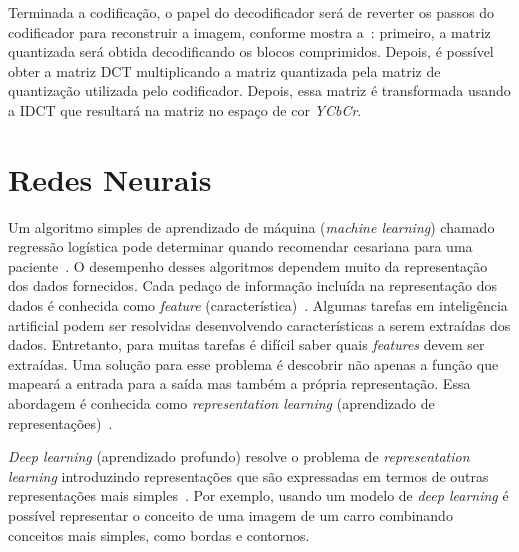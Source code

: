 Terminada a codificação, o papel do decodificador será de reverter os passos do codificador para reconstruir a imagem, conforme mostra a~: primeiro, a matriz quantizada será obtida decodificando os blocos comprimidos. Depois, é possível obter a matriz \acrshort{DCT} multiplicando a matriz quantizada pela matriz de quantização utilizada pelo codificador. Depois, essa matriz é transformada usando a \acrshort{IDCT} que resultará na matriz no espaço de cor \textit{YCbCr}.
\section{Redes Neurais}
Um algoritmo simples de aprendizado de máquina (\textit{machine learning}) chamado regressão logística pode determinar quando recomendar cesariana para uma paciente~\cite{mor1990ranking}. O desempenho desses algoritmos dependem muito da representação dos dados fornecidos. Cada pedaço de informação incluída na representação dos dados é conhecida como \textit{feature} (característica)~\cite{deeplearning}. Algumas tarefas em inteligência artificial podem ser resolvidas desenvolvendo características a serem extraídas dos dados. Entretanto, para muitas tarefas é difícil saber quais \textit{features} devem ser extraídas. Uma solução para esse problema é descobrir não apenas a função que mapeará a entrada para a saída mas também a própria representação. Essa abordagem é conhecida como \textit{representation learning} (aprendizado de representações)~\cite{deeplearning}.

\textit{Deep learning} (aprendizado profundo) resolve o problema de \textit{representation learning} introduzindo representações que são expressadas em termos de outras representações mais simples~\cite{deeplearning}. Por exemplo, usando um modelo de \textit{deep learning} é possível representar o conceito de uma imagem de um carro combinando conceitos mais simples, como bordas e contornos.

